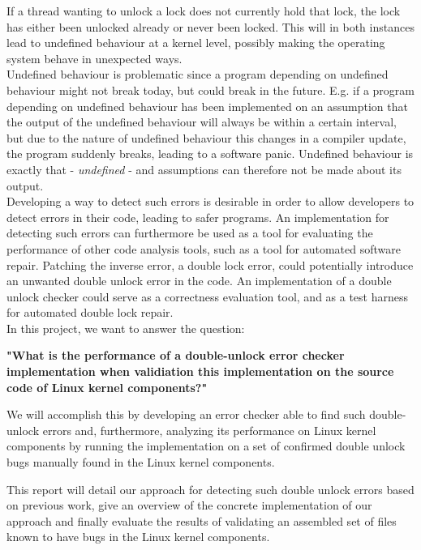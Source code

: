 \noindent If a thread wanting to unlock a lock does not currently hold that lock, the lock has either been unlocked already or never been locked. This will in both instances lead to undefined behaviour at a kernel level, possibly making the operating system behave in unexpected ways. \\

\noindent Undefined behaviour is problematic since a program depending on undefined behaviour might not break today, but could break in the future. E.g. if a program depending on undefined behaviour has been implemented on an assumption that the output of the undefined behaviour will always be within a certain interval, but due to the nature of undefined behaviour this changes in a compiler update, the program suddenly breaks, leading to a software panic. Undefined behaviour is exactly that - \textit{undefined} - and assumptions can therefore not be made about its output. \\

\noindent Developing a way to detect such errors is desirable in order to allow developers to detect errors in their code, leading to safer programs. An implementation for detecting such errors can furthermore be used as a tool for evaluating the performance of other code analysis tools, such as a tool for automated software repair. Patching the inverse error, a double lock error, could potentially introduce an unwanted double unlock error in the code. An implementation of a double unlock checker could serve as a correctness evaluation tool, and as a test harness for automated double lock repair. \\

\noindent In this project, we want to answer the question:

\begin{center}
    \textbf{"What is the performance of a double-unlock error checker implementation when validiation this implementation on the source code of Linux kernel components?"} 
\end{center}

\noindent We will accomplish this by developing an error checker able to find such double-unlock errors and, furthermore, analyzing its performance on Linux kernel components by running the implementation on a set of confirmed double unlock bugs manually found in the Linux kernel components. 

\noindent This report will detail our approach for detecting such double unlock errors based on previous work, give an overview of the concrete implementation of our approach and finally evaluate the results of validating an assembled set of files known to have bugs in the Linux kernel components.